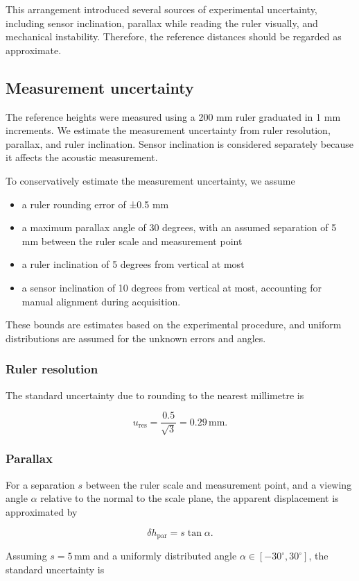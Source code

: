 \documentclass[11pt,a4paper]{article}
\begin{document}
This arrangement introduced several sources of experimental uncertainty, including sensor inclination, parallax while reading the ruler visually, and mechanical instability. Therefore, the reference distances should be regarded as approximate.
\subsection{Measurement uncertainty}
\label{sec:org4b0da83}
The reference heights were measured using a 200 mm ruler graduated in 1 mm increments. We estimate the measurement uncertainty from ruler resolution, parallax, and ruler inclination.  Sensor inclination is considered separately because it affects the acoustic measurement.

To conservatively estimate the measurement uncertainty, we assume
\begin{itemize}
\item a ruler rounding error of ±0.5 mm
\item a maximum parallax angle of 30 degrees, with an assumed separation of 5 mm between the ruler scale and measurement point
\item a ruler inclination of 5 degrees from vertical at most
\item a sensor inclination of 10 degrees from vertical at most, accounting
for manual alignment during acquisition.
\end{itemize}

These bounds are estimates based on the experimental procedure, and uniform distributions are assumed for the unknown errors and angles.
\subsubsection{Ruler resolution}
\label{sec:org30fbc71}
The standard uncertainty due to rounding to the nearest millimetre is

\[
u_{\mathrm{res}} = \frac{0.5}{\sqrt{3}}
                = 0.29\,\mathrm{mm}.
\]
\subsubsection{Parallax}
\label{sec:org4b94de5}
For a separation \(s\) between the ruler scale and measurement point, and a viewing angle \(\alpha\) relative to the normal to the scale plane, the apparent displacement is approximated by

\[
\delta h_{\mathrm{par}} = s\tan\alpha.
\]

Assuming \(s=5\,\mathrm{mm}\) and a uniformly distributed angle \(\alpha\in[-30^\circ,30^\circ]\), the standard uncertainty is
\end{document}
